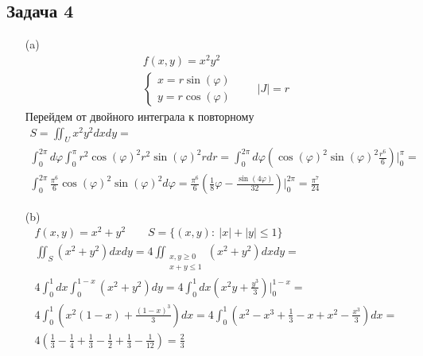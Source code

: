 \subsection*{Задача 4}
\begin{enumerate}
\item[(a)] 
	\begin{gather*}
		f(x,y) = x^2y^2\\
		\begin{cases}
			x = r \sin(\varphi)\\
			y = r \cos(\varphi)
		\end{cases}
		\qquad |J| = r
	\end{gather*}
	Перейдем от двойного интеграла к повторному
	\begin{gather*}
		S =
		\iint_{U} x^2 y^2 dx dy =\\
		\int_{0}^{2\pi} d \varphi \int_{0}^{\pi} r^2 \cos(\varphi)^2 r^2 \sin(\varphi)^2 rdr =
		\int_{0}^{2\pi} d \varphi \left(\cos(\varphi)^2 \sin(\varphi)^2 \frac{r^6}{6}\right)\bigg|_{0}^{\pi} =\\
		\int_{0}^{2\pi} \frac{\pi^6}{6} \cos(\varphi)^2 \sin(\varphi)^2 d \varphi =
		\frac{\pi^6}{6} \left(\frac{1}{8}\varphi - \frac{\sin(4\varphi)}{32}\right)\bigg|_{0}^{2\pi} = \frac{\pi^7}{24}
	\end{gather*}
\item[(b)] 
	\begin{gather*}
		f(x,y) = x^2 + y^2\qquad S = \{(x,y):\ |x| + |y| \leqslant 1\}\\
		\iint_{S} (x^2 + y^2) dxdy = 4\iint_{\substack{x,y \geqslant 0 \\ x+y \leqslant 1}} (x^2 + y^2)dxdy =\\
		4\int_{0}^{1} dx \int_{0}^{1-x} (x^2 + y^2) dy = 4\int_{0}^{1} dx (x^2y + \frac{y^3}{3})\bigg|_{0}^{1-x} =\\
		4\int_{0}^{1} \left(x^2(1-x) + \frac{(1-x)^3}{3}\right) dx = 4 \int_{0}^{1} (x^2 - x^3 + \frac{1}{3} - x + x^2 - \frac{x^3}{3}) dx =\\
		4\left(\frac{1}{3} - \frac{1}{4} + \frac{1}{3} - \frac{1}{2} + \frac{1}{3} - \frac{1}{12}\right) = \frac{2}{3}
	\end{gather*}
\end{enumerate}
\vskip 0.4in


\newpage
